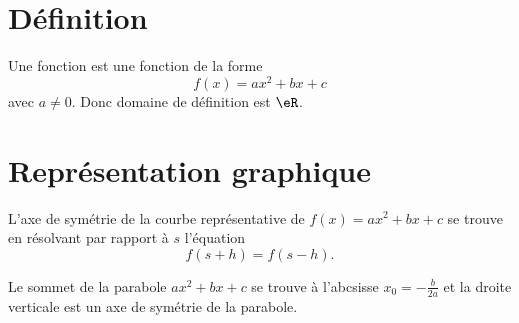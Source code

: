 


\section{Définition}

\begin{definition}
    Une fonction  est une fonction de la forme
    \begin{equation}
        f(x)=ax^2+bx+c
    \end{equation}
    avec \( a\neq 0\). Donc domaine de définition est \( \eR\).
\end{definition}

\section{Représentation graphique}

L'axe de symétrie de la courbe représentative de \( f(x)=ax^2+bx+c\) se trouve en résolvant par rapport à \( s\) l'équation
\begin{equation}
    f(s+h)=f(s-h).
\end{equation}

\begin{Aretenir}
    Le sommet de la parabole \( ax^2+bx+c\) se trouve à l'abcsisse \( x_0=-\frac{ b }{ 2a }\) et la droite verticale est un axe de symétrie de la parabole.
\end{Aretenir}


